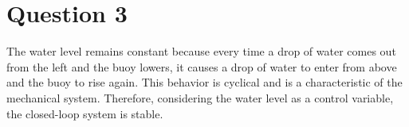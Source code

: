 \section{Question 3}
The water level remains constant because every time a drop of water comes out from the left and the buoy lowers, it causes a drop of water to enter from above and the buoy to rise again. This behavior is cyclical and is a characteristic of the mechanical system. Therefore, considering the water level as a control variable, the closed-loop system is stable.
